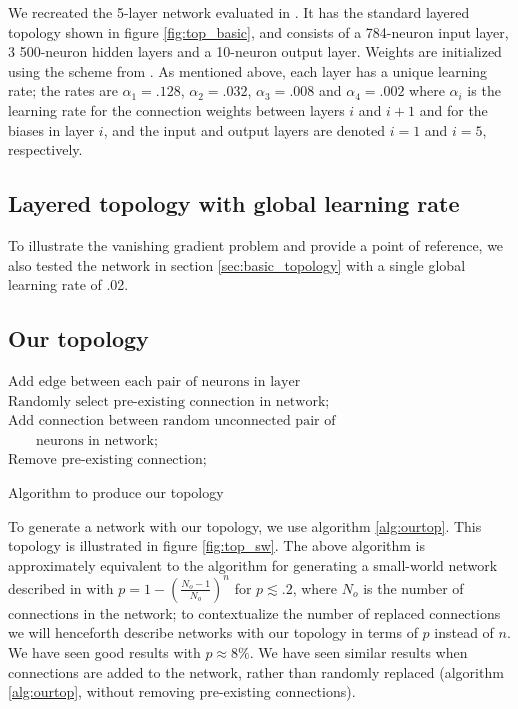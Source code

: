 \documentclass[utf8]{frontiersSCNS}
\begin{document}
We recreated the 5-layer network evaluated in \citep{scellier17}. It has the standard layered topology shown in figure \ref{fig:top_basic}, and consists of a 784-neuron input layer, 3 500-neuron hidden layers and a 10-neuron output layer. Weights are initialized using the scheme from \citep{glorot2010}. As mentioned above, each layer has a unique learning rate; the rates are $\alpha_1=.128$, $\alpha_2=.032$, $\alpha_3=.008$ and $\alpha_4=.002$ where $\alpha_i$ is the learning rate for the connection weights between layers $i$ and $i+1$ and for the biases in layer $i$, and the input and output layers are denoted $i=1$ and $i=5$, respectively.

\subsection{Layered topology with global learning rate}
\label{sec:basic_topology_uniform}

To illustrate the vanishing gradient problem and provide a point of reference, we also tested the network in section \ref{sec:basic_topology} with a single global learning rate of .02.

\subsection{Our topology}
\label{sec:our_topology}

\begin{algorithm}
{
	$\text{Add edge between each pair of neurons in layer}$
}
{
	$\text{Randomly select pre-existing connection in network}$;\\
	$\text{Add connection between random unconnected pair of}$\\
	$\qquad\text{neurons in network}$;\\
	$\text{Remove pre-existing connection}$;
}
\caption{Algorithm to produce our topology} \label{alg:ourtop}
\end{algorithm}

To generate a network with our topology, we use algorithm \ref{alg:ourtop}. This topology is illustrated in figure \ref{fig:top_sw}. The above algorithm is approximately equivalent to the algorithm for generating a small-world network described in \citep{watts98} with $p=1-(\frac{N_o-1}{N_o})^n$ for $p\lesssim .2$, where $N_o$ is the number of connections in the network; to contextualize the number of replaced connections we will henceforth describe networks with our topology in terms of $p$ instead of $n$. We have seen good results with $p\approx 8\%$. We have seen similar results when connections are added to the network, rather than randomly replaced (algorithm \ref{alg:ourtop}, without removing pre-existing connections).
\end{document}
